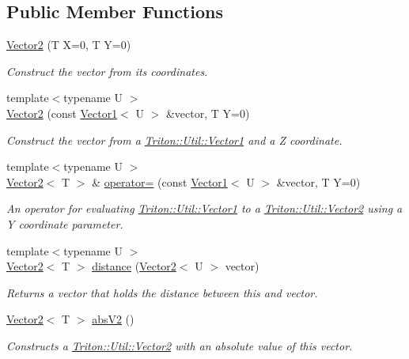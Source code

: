 \subsection*{Public Member Functions}
\begin{DoxyCompactItemize}
\item 
\hyperlink{class_triton_1_1_util_1_1_vector2_a2b54901725ae54bd42f40c710ae976d9}{Vector2} (T X=0, T Y=0)
\begin{DoxyCompactList}\small\item\em Construct the vector from its coordinates. \end{DoxyCompactList}\item 
{\footnotesize template$<$typename U $>$ }\\\hyperlink{class_triton_1_1_util_1_1_vector2_ae06128c7bf34f56168c91555a10a638d}{Vector2} (const \hyperlink{class_triton_1_1_util_1_1_vector1}{Vector1}$<$ U $>$ \&vector, T Y=0)
\begin{DoxyCompactList}\small\item\em Construct the vector from a \hyperlink{class_triton_1_1_util_1_1_vector1}{Triton\+::\+Util\+::\+Vector1} and a Z coordinate. \end{DoxyCompactList}\item 
{\footnotesize template$<$typename U $>$ }\\\hyperlink{class_triton_1_1_util_1_1_vector2}{Vector2}$<$ T $>$ \& \hyperlink{class_triton_1_1_util_1_1_vector2_a00b543ed959c5417e277e159dd0d0335}{operator=} (const \hyperlink{class_triton_1_1_util_1_1_vector1}{Vector1}$<$ U $>$ \&vector, T Y=0)
\begin{DoxyCompactList}\small\item\em An operator for evaluating \hyperlink{class_triton_1_1_util_1_1_vector1}{Triton\+::\+Util\+::\+Vector1} to a \hyperlink{class_triton_1_1_util_1_1_vector2}{Triton\+::\+Util\+::\+Vector2} using a Y coordinate parameter. \end{DoxyCompactList}\item 
{\footnotesize template$<$typename U $>$ }\\\hyperlink{class_triton_1_1_util_1_1_vector2}{Vector2}$<$ T $>$ \hyperlink{class_triton_1_1_util_1_1_vector2_a3acc6c063f70b0dcfe4994dc632e1ba6}{distance} (\hyperlink{class_triton_1_1_util_1_1_vector2}{Vector2}$<$ U $>$ vector)
\begin{DoxyCompactList}\small\item\em Returns a vector that holds the distance between this and vector. \end{DoxyCompactList}\item 
\hyperlink{class_triton_1_1_util_1_1_vector2}{Vector2}$<$ T $>$ \hyperlink{class_triton_1_1_util_1_1_vector2_a0a061ce609a249250a16c6dcfc84ac7e}{abs\+V2} ()
\begin{DoxyCompactList}\small\item\em Constructs a \hyperlink{class_triton_1_1_util_1_1_vector2}{Triton\+::\+Util\+::\+Vector2} with an absolute value of this vector. \end{DoxyCompactList}\end{DoxyCompactItemize}
